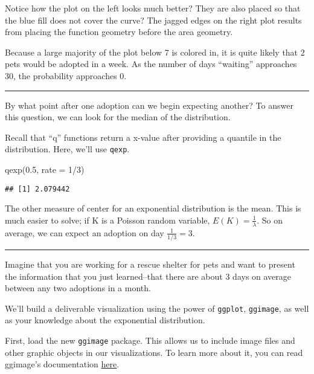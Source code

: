 \documentclass[
]{article}
\newenvironment{Shaded}{\begin{snugshade}}{\end{snugshade}}
\newcommand{\AttributeTok}[1]{\textcolor[rgb]{0.77,0.63,0.00}{#1}}
\newcommand{\DecValTok}[1]{\textcolor[rgb]{0.00,0.00,0.81}{#1}}
\newcommand{\FloatTok}[1]{\textcolor[rgb]{0.00,0.00,0.81}{#1}}
\newcommand{\FunctionTok}[1]{\textcolor[rgb]{0.00,0.00,0.00}{#1}}
\newcommand{\NormalTok}[1]{#1}
\newcommand{\SpecialCharTok}[1]{\textcolor[rgb]{0.00,0.00,0.00}{#1}}
\begin{document}
Notice how the plot on the left looks much better? They are also placed so that the blue fill does not cover the curve? The jagged edges on the right plot results from placing the function geometry before the area geometry.

Because a large majority of the plot below 7 is colored in, it is quite likely that 2 pets would be adopted in a week. As the number of days ``waiting'' approaches 30, the probability approaches 0.

\begin{center}\rule{0.5\linewidth}{0.5pt}\end{center}

By what point after one adoption can we begin expecting another? To answer this question, we can look for the median of the distribution.

Recall that ``q'' functions return a x-value after providing a quantile in the distribution. Here, we'll use \texttt{qexp}.

\begin{Shaded}
\begin{Highlighting}[]
\FunctionTok{qexp}\NormalTok{(}\FloatTok{0.5}\NormalTok{, }\AttributeTok{rate =} \DecValTok{1}\SpecialCharTok{/}\DecValTok{3}\NormalTok{)}
\end{Highlighting}
\end{Shaded}

\begin{verbatim}
## [1] 2.079442
\end{verbatim}

The other measure of center for an exponential distribution is the mean. This is much easier to solve; if K is a Poisson random variable, \(E(K)=\frac{1}{\lambda}\). So on average, we can expect an adoption on day \(\frac{1}{1/3}=3\).

\begin{center}\rule{0.5\linewidth}{0.5pt}\end{center}

Imagine that you are working for a rescue shelter for pets and want to present the information that you just learned--that there are about 3 days on average between any two adoptions in a month.

We'll build a deliverable visualization using the power of \texttt{ggplot}, \texttt{ggimage}, as well as your knowledge about the exponential distribution.

First, load the new \texttt{ggimage} package. This allows us to include image files and other graphic objects in our visualizations. To learn more about it, you can read ggimage's documentation \href{https://cran.r-project.org/web/packages/ggimage/index.html}{here}.
\end{document}
